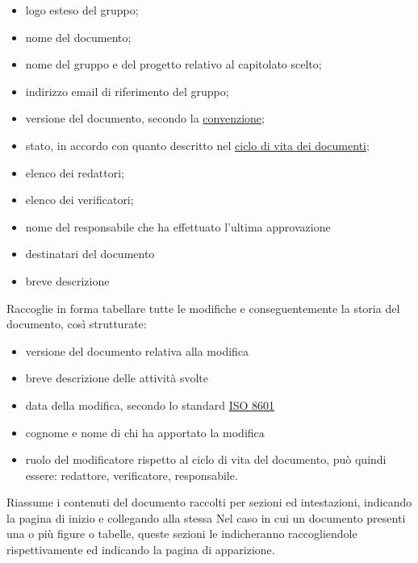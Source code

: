             \begin{itemize}
                \item logo esteso del gruppo;
                \item nome del documento;
                \item nome del gruppo e del progetto relativo al capitolato scelto;
                \item indirizzo email di riferimento del gruppo;
                \item versione del documento, secondo la \hyperref[versions]{convenzione};
                \item stato, in accordo con quanto descritto nel \hyperref[ciclovitadoc]{ciclo di vita dei documenti};
                \item elenco dei redattori;
                \item elenco dei verificatori;
                \item nome del responsabile che ha effettuato l'ultima approvazione
                \item destinatari del documento
                \item breve descrizione
            \end{itemize}
            Raccoglie in forma tabellare tutte le modifiche e conseguentemente la storia del documento, così strutturate:
            \begin{itemize}
                \item versione del documento relativa alla modifica
                \item breve descrizione delle attività svolte
                \item data della modifica, secondo lo standard \href{https://www.iso.org/iso-8601-date-and-time-format.html}{ISO 8601}
                \item cognome e nome di chi ha apportato la modifica
                \item ruolo del modificatore rispetto al ciclo di vita del documento, può quindi essere: redattore, verificatore, responsabile.
            \end{itemize}
            Riassume i contenuti del documento raccolti per sezioni ed intestazioni, indicando la pagina di inizio e collegando alla stessa
            Nel caso in cui un documento presenti una o più figure o tabelle, queste sezioni le indicheranno raccogliendole rispettivamente ed indicando la pagina di apparizione.
